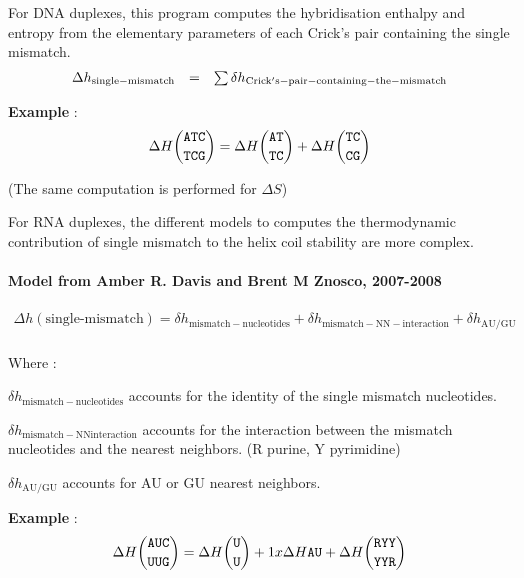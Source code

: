 \documentclass{article}
\begin{document}
For DNA duplexes, this program computes the hybridisation enthalpy and entropy from the elementary 
parameters of each Crick's pair containing the single mismatch. 
\begin{displaymath}
  \begin{array}[t]{ccc}
  \Delta{}h_\mathrm{single-mismatch}&=&\sum \delta{}h_\mathrm{Crick's-pair-containing-the-mismatch}\\
  \end{array}
\end{displaymath}

\textbf{Example} :
\begin{multline*}
\Delta H {\mbox{\texttt{ATC}} \choose \mbox{\texttt{TCG}}} = 
\Delta H {\mbox{\texttt{AT}} \choose \mbox{\texttt{TC}} } + 
\Delta H {\mbox{\texttt{TC}} \choose \mbox{\texttt{CG}} } \\
\end{multline*}

       (The same computation is performed for $\Delta S$)

For RNA duplexes, the different models to computes the thermodynamic contribution of single mismatch to the helix coil 
stability are more complex.


\paragraph{\textbf{Model from Amber R. Davis and Brent M Znosco, 2007-2008}}

\begin{multline*}
\Delta h {(\mbox{single-mismatch})} = 
\delta{}h_\mathrm{mismatch-nucleotides} +
\delta{}h_\mathrm{mismatch-NN-interaction} +
\delta{}h_\mathrm{AU/GU} \\
\end{multline*}

Where :

$\delta{}h_\mathrm{mismatch-nucleotides}$ accounts for the identity of the single mismatch nucleotides.

$\delta{}h_\mathrm{mismatch-NN interaction}$ accounts for the interaction between the mismatch nucleotides and 
the nearest neighbors. (R purine, Y pyrimidine)

$\delta{}h_\mathrm{AU/GU}$ accounts for AU or GU nearest neighbors.

\textbf{Example} :
\begin{multline*}
\Delta H {\mbox{\texttt{AUC}} \choose \mbox{\texttt{UUG}}} = 
\Delta H {\mbox{\texttt{U}} \choose \mbox{\texttt{U}} } + 
1 x \Delta H {\mbox{\texttt{AU}} } +
\Delta H {\mbox{\texttt{RYY}} \choose \mbox{\texttt{YYR}} } \\
\end{multline*}
\end{document}
